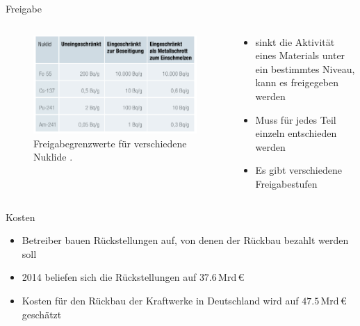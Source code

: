 \begin{frame}{Freigabe}
  \begin{columns}

    \begin{column}{0.48\textwidth}
      \begin{figure}
         \centering
         \includegraphics[width=1\textwidth]{./bilder/freigabeoption.PNG}
         \caption{Freigabegrenzwerte für verschiedene Nuklide \cite{stilllegung_grs}. }
         \label{ fig: freigabegrenzwerte}
       \end{figure}
    \end{column}

    \begin{column}{0.48\textwidth}
      \begin{itemize}
        \setlength\itemsep{1.2em}
        \item{ sinkt die Aktivität eines Materials unter ein bestimmtes Niveau, kann es freigegeben werden }
        \item{ Muss für jedes Teil einzeln entschieden werden}
        \item {Es gibt verschiedene Freigabestufen}
      \end{itemize}
    \end{column}

  \end{columns}
\end{frame}



\begin{frame}{Kosten}
  \begin{itemize}
    \setlength\itemsep{1.2em}
    \item{ Betreiber bauen Rückstellungen auf, von denen der Rückbau bezahlt werden soll}
    \item{ 2014 beliefen sich die Rückstellungen auf $\num{37.6} \, \mathrm{Mrd} \,\euro$}
    \item{Kosten für den Rückbau der Kraftwerke in Deutschland wird auf  $\num{47.5} \, \mathrm{Mrd} \,\euro$ geschätzt}
  \end{itemize}
\end{frame}



